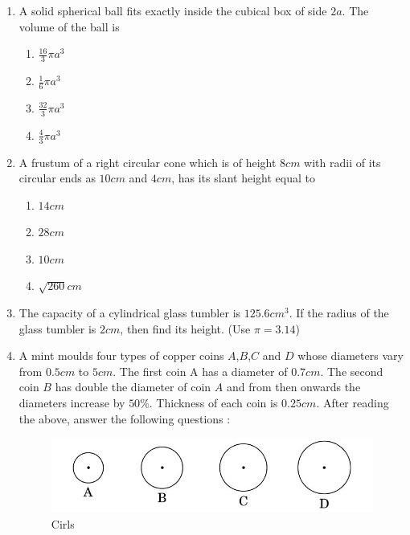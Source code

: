 \begin{enumerate}
    \item A solid spherical ball fits exactly inside the cubical box of side $2a$. The volume of the ball is 
\begin{enumerate}
    \item $\frac{16}{3}\pi a^3$
    \item $\frac{1}{6}\pi a^3$
    \item $\frac{32}{3}\pi a^3$
        \item $\frac{4}{3}\pi a^3$
    \end{enumerate}
    
    \item A frustum of a right circular cone which is of height $8 cm$ with radii of its circular ends as $10 cm$ and $4 cm$, has its slant height equal to 
\begin{enumerate}
    \item $ 14 cm$
    \item $28 cm$
    \item $10 cm$
    \item $\sqrt{260}cm$
    \end{enumerate}
    
    \item The capacity of a cylindrical glass tumbler is $125.6 cm^3$. If the radius of the glass tumbler is $2 cm$, then find its height. (Use $\pi= 3.14$)
\newpage
\item A mint moulds four types of copper coins $A$,$B$,$C$ and $D$ whose diameters vary from $0.5 cm$ to $5 cm$. The first coin A has a diameter of $0.7 cm$. The second coin $B$ has double the diameter of coin $A$ and from then onwards the diameters increase by $50\%$. Thickness of each coin is $0.25 cm$.
    After reading the above, answer the following questions :
\begin{figure}[H]
    \centering
    \includegraphics[width=\columnwidth]{figs/cirls.png}
    \caption{Cirls}
    \label{fig:copper coins}
    \end{figure}
      

\end{enumerate}
